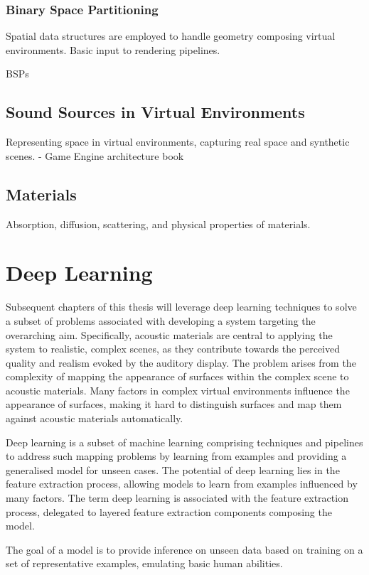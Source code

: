 \subsubsection{Binary Space Partitioning}


Spatial data structures are employed to handle geometry composing virtual environments. 
Basic input to rendering pipelines. 

BSPs


\subsection{Sound Sources in Virtual Environments}


Representing space in virtual environments, capturing real space and synthetic scenes.
- Game Engine architecture book                             

\subsection{Materials}
Absorption, diffusion, scattering, and physical properties of materials.


\section{Deep Learning}
Subsequent chapters of this thesis will leverage deep learning techniques to solve a subset of problems associated with developing a system targeting the overarching aim. Specifically, acoustic materials are central to applying the system to realistic, complex scenes, as they contribute towards the perceived quality and realism evoked by the auditory display. The problem arises from the complexity of mapping the appearance of surfaces within the complex scene to acoustic materials. Many factors in complex virtual environments influence the appearance of surfaces, making it hard to distinguish surfaces and map them against acoustic materials automatically.\par
Deep learning is a subset of machine learning comprising techniques and pipelines to address such mapping problems by learning from examples and providing a generalised model for unseen cases. The potential of deep learning lies in the feature extraction process, allowing models to learn from examples influenced by many factors. The term deep learning is associated with the feature extraction process, delegated to layered feature extraction components composing the model.\par
The goal of a model is to provide inference on unseen data based on training on a set of representative examples, emulating basic human abilities.

